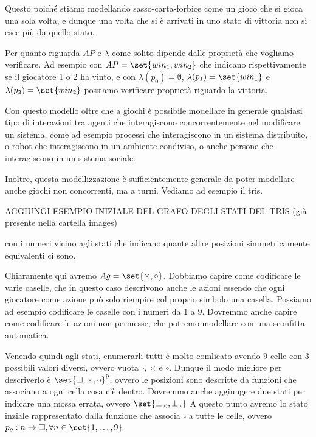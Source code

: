 Questo poiché stiamo modellando sasso-carta-forbice come un gioco che si gioca una sola volta, e dunque una volta che si è arrivati in uno stato di vittoria non si esce più da quello stato.

Per quanto riguarda \(AP\) e \(\lambda\) come solito dipende dalle proprietà che vogliamo verificare. Ad esempio con \(AP = \set{{win}_1, {win}_2}\) che indicano rispettivamente se il giocatore 1 o 2 ha vinto, e con \(\lambda(p_0) = \emptyset\), \(\lambda(p_1) = \set{{win}_1}\) e \(\lambda(p_2) = \set{{win}_2}\) possiamo verificare proprietà riguardo la vittoria.

Con questo modello oltre che a giochi è possibile modellare in generale qualsiasi tipo di interazioni tra agenti che interagiscono concorrentemente nel modificare un sistema, come ad esempio processi che interagiscono in un sistema distribuito, o robot che interagiscono in un ambiente condiviso, o anche persone che interagiscono in un sistema sociale.

Inoltre, questa modellizzazione è sufficientemente generale da poter modellare anche giochi non concorrenti, ma a turni. Vediamo ad esempio il tris.

AGGIUNGI ESEMPIO INIZIALE DEL GRAFO DEGLI STATI DEL TRIS (già presente nella cartella images)

con i numeri vicino agli stati che indicano quante altre posizioni simmetricamente equivalenti ci sono.

Chiaramente qui avremo \(Ag = \set{\times, \circ}\). Dobbiamo capire come codificare le varie caselle, che in questo caso descrivono anche le azioni essendo che ogni giocatore come azione può solo riempire col proprio simbolo una casella. Possiamo ad esempio codificare le caselle con i numeri da \(1\) a \(9\). Dovremmo anche capire come codificare le azioni non permesse, che potremo modellare con una sconfitta automatica.

Venendo quindi agli stati, enumerarli tutti è molto comlicato avendo \(9\) celle con \(3\) possibili valori diversi, ovvero vuota \(\square\), \(\times\) e \(\circ\). Dunque il modo migliore per descriverlo è \(\set{\square, \times, \circ}^9\), ovvero le posizioni sono descritte da funzioni che associano a ogni cella cosa c'è dentro. Dovremmo anche aggiungere due stati per indicare una mossa errata, ovvero \(\set{\bot_{\times}, \bot_{\circ}}\) A questo punto avremo lo stato inziale rappresentato dalla funzione che associa \(\square\) a tutte le celle, ovvero \(p_o: n \to \square, \forall n \in \set{1,\dots,9}\).

